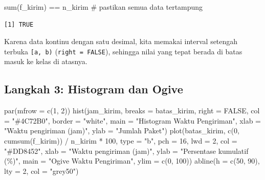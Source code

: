 \documentclass[
  indonesian,
  letterpaper,
]{book}
\newenvironment{Shaded}{\begin{snugshade}}{\end{snugshade}}
\newcommand{\AttributeTok}[1]{\textcolor[rgb]{0.40,0.45,0.13}{#1}}
\newcommand{\CommentTok}[1]{\textcolor[rgb]{0.37,0.37,0.37}{#1}}
\newcommand{\ConstantTok}[1]{\textcolor[rgb]{0.56,0.35,0.01}{#1}}
\newcommand{\DecValTok}[1]{\textcolor[rgb]{0.68,0.00,0.00}{#1}}
\newcommand{\FunctionTok}[1]{\textcolor[rgb]{0.28,0.35,0.67}{#1}}
\newcommand{\NormalTok}[1]{\textcolor[rgb]{0.00,0.23,0.31}{#1}}
\newcommand{\SpecialCharTok}[1]{\textcolor[rgb]{0.37,0.37,0.37}{#1}}
\newcommand{\StringTok}[1]{\textcolor[rgb]{0.13,0.47,0.30}{#1}}
\begin{document}
\begin{Shaded}
\begin{Highlighting}[]
\FunctionTok{sum}\NormalTok{(f\_kirim) }\SpecialCharTok{==}\NormalTok{ n\_kirim }\CommentTok{\# pastikan semua data tertampung}
\end{Highlighting}
\end{Shaded}

\begin{verbatim}
[1] TRUE
\end{verbatim}

Karena data kontinu dengan satu desimal, kita memakai interval setengah
terbuka \texttt{{[}a,\ b)} (\texttt{right\ =\ FALSE}), sehingga nilai
yang tepat berada di batas masuk ke kelas di atasnya.

\subsection{Langkah 3: Histogram dan
Ogive}\label{langkah-3-histogram-dan-ogive}

\begin{Shaded}
\begin{Highlighting}[]
\FunctionTok{par}\NormalTok{(}\AttributeTok{mfrow =} \FunctionTok{c}\NormalTok{(}\DecValTok{1}\NormalTok{, }\DecValTok{2}\NormalTok{))}
\FunctionTok{hist}\NormalTok{(jam\_kirim, }\AttributeTok{breaks =}\NormalTok{ batas\_kirim, }\AttributeTok{right =} \ConstantTok{FALSE}\NormalTok{, }\AttributeTok{col =} \StringTok{"\#4C72B0"}\NormalTok{, }\AttributeTok{border =} \StringTok{"white"}\NormalTok{,}
\AttributeTok{main =} \StringTok{"Histogram Waktu Pengiriman"}\NormalTok{, }\AttributeTok{xlab =} \StringTok{"Waktu pengiriman (jam)"}\NormalTok{, }\AttributeTok{ylab =} \StringTok{"Jumlah Paket"}\NormalTok{)}
\FunctionTok{plot}\NormalTok{(batas\_kirim, }\FunctionTok{c}\NormalTok{(}\DecValTok{0}\NormalTok{, }\FunctionTok{cumsum}\NormalTok{(f\_kirim)) }\SpecialCharTok{/}\NormalTok{ n\_kirim }\SpecialCharTok{*} \DecValTok{100}\NormalTok{, }\AttributeTok{type =} \StringTok{"b"}\NormalTok{, }\AttributeTok{pch =} \DecValTok{16}\NormalTok{, }\AttributeTok{lwd =} \DecValTok{2}\NormalTok{,}
\AttributeTok{col =} \StringTok{"\#DD8452"}\NormalTok{, }\AttributeTok{xlab =} \StringTok{"Waktu pengiriman (jam)"}\NormalTok{, }\AttributeTok{ylab =} \StringTok{"Persentase kumulatif (\%)"}\NormalTok{,}
\AttributeTok{main =} \StringTok{"Ogive Waktu Pengiriman"}\NormalTok{, }\AttributeTok{ylim =} \FunctionTok{c}\NormalTok{(}\DecValTok{0}\NormalTok{, }\DecValTok{100}\NormalTok{))}
\FunctionTok{abline}\NormalTok{(}\AttributeTok{h =} \FunctionTok{c}\NormalTok{(}\DecValTok{50}\NormalTok{, }\DecValTok{90}\NormalTok{), }\AttributeTok{lty =} \DecValTok{2}\NormalTok{, }\AttributeTok{col =} \StringTok{"grey50"}\NormalTok{)}
\end{Highlighting}
\end{Shaded}
\end{document}
